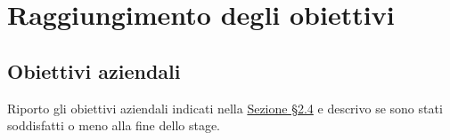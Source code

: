 \section{Raggiungimento degli obiettivi}
\label{sez:raggiungimento-obiettivi}

\subsection{Obiettivi aziendali}
\label{subsec:raggiungimento-obiettivi-aziendali}

Riporto gli obiettivi aziendali indicati nella \hyperref[sez:obiettivi-aziendali]{Sezione §2.4} e descrivo se sono stati soddisfatti o meno alla fine dello stage.\\

\renewcommand{\arraystretch}{1.5} %

